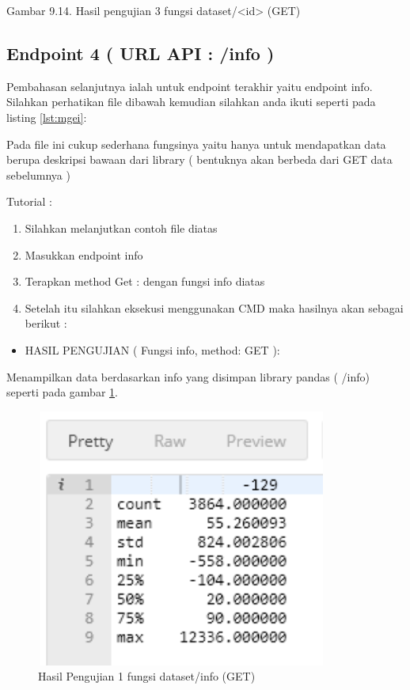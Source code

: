 \begin{enumerate}
Gambar 9.14. Hasil pengujian 3 fungsi dataset/<id> (GET)
\end{enumerate}

\subsection{Endpoint 4 ( URL API : /info )}
Pembahasan selanjutnya ialah untuk endpoint terakhir yaitu endpoint info. Silahkan perhatikan file dibawah kemudian silahkan anda ikuti seperti pada listing \ref{lst:mgei}:


Pada file ini cukup sederhana fungsinya yaitu hanya untuk mendapatkan data berupa deskripsi bawaan dari library ( bentuknya akan berbeda dari GET data sebelumnya )

Tutorial :
\begin{enumerate}
\item Silahkan melanjutkan contoh file diatas
\item Masukkan endpoint info
\item Terapkan method Get : dengan fungsi info diatas
\item Setelah itu silahkan eksekusi menggunakan CMD maka hasilnya akan sebagai berikut :
\end{enumerate}
\begin{itemize}
\item HASIL PENGUJIAN ( Fungsi info, method: GET ):
\end{itemize}
Menampilkan data berdasarkan info yang disimpan library pandas ( /info) seperti pada gambar \ref{fig:hujiinf}.
\begin{figure}[!htbp]
	\centerline{\includegraphics[width=0.85\textwidth]{figures/10/hujiinf.PNG}}
	\caption{Hasil Pengujian 1 fungsi dataset/info (GET)}
	\label{fig:hujiinf}
\end{figure}

